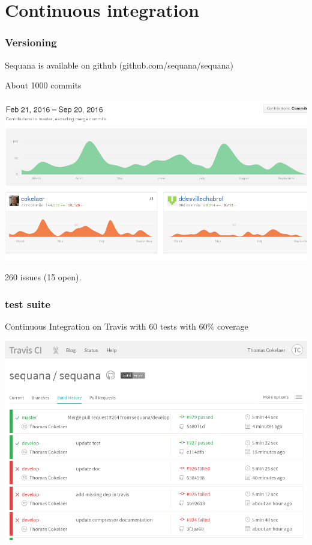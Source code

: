 \documentclass{beamer}
\begin{document}
\section{Continuous integration}

\begin{frame}[fragile]
 \frametitle{Versioning}
Sequana is available on github (github.com/sequana/sequana)

About 1000 commits \\
\begin{center}
\includegraphics[scale=0.2]{images/commits}
\end{center}
260 issues (15 open).

\end{frame}



\begin{frame}[fragile]
    \frametitle{test suite}
    \begin{block}{}
    Continuous Integration on Travis with 60 tests with 60\% coverage
    \end{block}
    
    
        \includegraphics[scale=0.35]{images/travis}
\end{frame}
\end{document}
